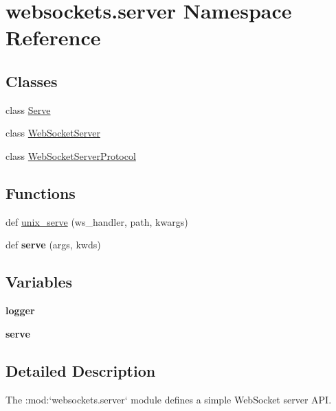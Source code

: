 \hypertarget{namespacewebsockets_1_1server}{}\section{websockets.\+server Namespace Reference}
\label{namespacewebsockets_1_1server}
\subsection*{Classes}
\begin{DoxyCompactItemize}
\item 
class \hyperlink{classwebsockets_1_1server_1_1_serve}{Serve}
\item 
class \hyperlink{classwebsockets_1_1server_1_1_web_socket_server}{Web\+Socket\+Server}
\item 
class \hyperlink{classwebsockets_1_1server_1_1_web_socket_server_protocol}{Web\+Socket\+Server\+Protocol}
\end{DoxyCompactItemize}
\subsection*{Functions}
\begin{DoxyCompactItemize}
\item 
def \hyperlink{namespacewebsockets_1_1server_a87c4bd8b9d6a51924dcb6acdad9db174}{unix\+\_\+serve} (ws\+\_\+handler, path, kwargs)
\item 
\mbox{\label{namespacewebsockets_1_1server_a8798ba30b4746584755b6f9e40da7beb}} 
def {\bfseries serve} (args, kwds)
\end{DoxyCompactItemize}
\subsection*{Variables}
\begin{DoxyCompactItemize}
\item 
\mbox{\label{namespacewebsockets_1_1server_a8da2b6864f11c2d32b3e67f529653a43}} 
{\bfseries logger}
\item 
\mbox{\label{namespacewebsockets_1_1server_a48e58e13634c5531b6308499865aa45c}} 
{\bfseries serve}
\end{DoxyCompactItemize}


\subsection{Detailed Description}
\begin{DoxyVerb}The :mod:`websockets.server` module defines a simple WebSocket server API.\end{DoxyVerb}
 

